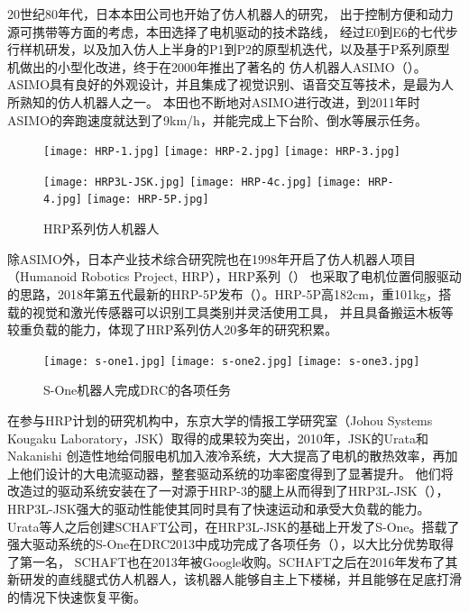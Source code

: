 20世纪80年代，日本本田公司也开始了仿人机器人的研究，
出于控制方便和动力源可携带等方面的考虑，本田选择了电机驱动的技术路线，
经过E0到E6的七代步行样机研发，以及加入仿人上半身的P1到P2的原型机迭代，以及基于P系列原型机做出的小型化改进，终于在2000年推出了著名的
仿人机器人ASIMO（）。 ASIMO具有良好的外观设计，并且集成了视觉识别、语音交互等技术，是最为人所熟知的仿人机器人之一。
本田也不断地对ASIMO进行改进，到2011年时ASIMO的奔跑速度就达到了9km/h，并能完成上下台阶、倒水等展示任务\cite{Honda}。
\begin{figure}[htbp]
    \centering
        {%
            \texttt{[image: HRP-1.jpg]}}
        {%
            \texttt{[image: HRP-2.jpg]}}
        {%
            \texttt{[image: HRP-3.jpg]}}

        {%
            \texttt{[image: HRP3L-JSK.jpg]}}   
        {%
            \texttt{[image: HRP-4c.jpg]}}       
        {%
            \texttt{[image: HRP-4.jpg]}}       
        {%
            \texttt{[image: HRP-5P.jpg]}}       

    \caption{HRP系列仿人机器人\label{fig:japan_hrp}}
\end{figure}

除ASIMO外，日本产业技术综合研究院也在1998年开启了仿人机器人项目（Humanoid Robotics Project, HRP），HRP系列（）
也采取了电机位置伺服驱动的思路，2018年第五代最新的HRP-5P发布（）。HRP-5P高182cm，重101kg，搭载的视觉和激光传感器可以识别工具类别并灵活使用工具，
并且具备搬运木板等较重负载的能力\cite{HRP}，体现了HRP系列仿人20多年的研究积累。
\begin{figure}[htbp]
    \centering
    \texttt{[image: s-one1.jpg]}
    \texttt{[image: s-one2.jpg]}
    \texttt{[image: s-one3.jpg]}
    \caption{\label{fig:s-one}S-One机器人完成DRC的各项任务}
\end{figure}

在参与HRP计划的研究机构中，东京大学的情报工学研究室（Johou Systems Kougaku Laboratory，JSK）取得的成果较为突出，2010年，JSK的Urata和Nakanishi
创造性地给伺服电机加入液冷系统，大大提高了电机的散热效率，再加上他们设计的大电流驱动器，整套驱动系统的功率密度得到了显著提升。
他们将改造过的驱动系统安装在了一对源于HRP-3的腿上从而得到了HRP3L-JSK（），HRP3L-JSK强大的驱动性能使其同时具有了快速运动和承受大负载的能力。
Urata等人之后创建SCHAFT公司，在HRP3L-JSK的基础上开发了S-One。搭载了强大驱动系统的S-One在DRC2013中成功完成了各项任务（），以大比分优势取得了第一名，
SCHAFT也在2013年被Google收购。SCHAFT之后在2016年发布了其新研发的直线腿式仿人机器人，该机器人能够自主上下楼梯，并且能够在足底打滑的情况下快速恢复平衡\cite{SCHAFT}。
